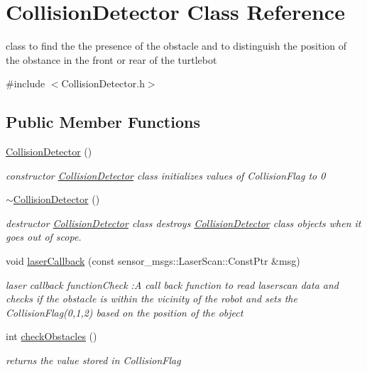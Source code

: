 \hypertarget{classCollisionDetector}{}\section{Collision\+Detector Class Reference}
\label{classCollisionDetector}


class to find the the presence of the obstacle and to distinguish the position of the obstance in the front or rear of the turtlebot  




{\ttfamily \#include $<$Collision\+Detector.\+h$>$}

\subsection*{Public Member Functions}
\begin{DoxyCompactItemize}
\item 
\hyperlink{classCollisionDetector_ab3f66bd8d272a21674e38bf46d4d31e0}{Collision\+Detector} ()
\begin{DoxyCompactList}\small\item\em constructor \hyperlink{classCollisionDetector}{Collision\+Detector} class initializes values of Collision\+Flag to 0 \end{DoxyCompactList}\item 
\hyperlink{classCollisionDetector_a1a0f7a386920e0cf83a101be92f04598}{$\sim$\+Collision\+Detector} ()
\begin{DoxyCompactList}\small\item\em destructor \hyperlink{classCollisionDetector}{Collision\+Detector} class destroys \hyperlink{classCollisionDetector}{Collision\+Detector} class objects when it goes out of scope. \end{DoxyCompactList}\item 
void \hyperlink{classCollisionDetector_af960b1e537e227487ee117d17be962c6}{laser\+Callback} (const sensor\+\_\+msgs\+::\+Laser\+Scan\+::\+Const\+Ptr \&msg)
\begin{DoxyCompactList}\small\item\em laser callback function\+Check \+:A call back function to read laserscan data and checks if the obstacle is within the vicinity of the robot and sets the Collision\+Flag(0,1,2) based on the position of the object \end{DoxyCompactList}\item 
int \hyperlink{classCollisionDetector_a04d7a0db86d2023cbc196fa0831f6dba}{check\+Obstacles} ()
\begin{DoxyCompactList}\small\item\em returns the value stored in Collision\+Flag \end{DoxyCompactList}\end{DoxyCompactItemize}
